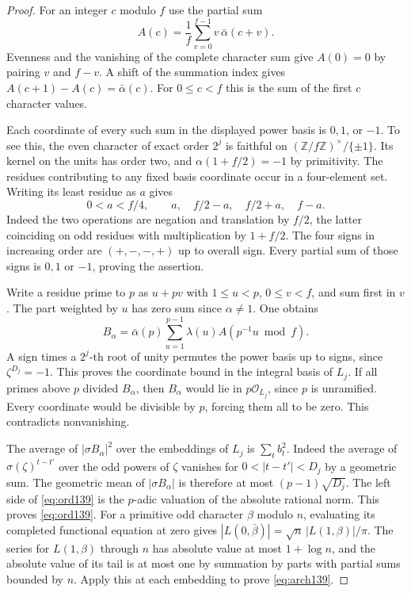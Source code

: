 \documentclass[a4paper,11pt]{article}
\theoremstyle{definition}
\theoremstyle{remark}
\newcommand{\ZZ}{\mathbb Z}\newcommand{\ord}{\operatorname{ord}}
\numberwithin{equation}{section}
\begin{document}
\begin{proof}
For an integer \(c\) modulo \(f\) use the partial sum
\[
 A(c)=\frac1f\sum_{v=0}^{f-1}v\,\bar\alpha(c+v).
\]
Evenness and the vanishing of the complete character sum give
\(A(0)=0\) by pairing \(v\) and \(f-v\). A shift of the summation
index gives \(A(c+1)-A(c)=\bar\alpha(c)\). For \(0\le c<f\)
this is the sum of the first \(c\) character values.

Each coordinate of every such sum in the displayed power basis
is \(0,1\), or \(-1\). To see this, the even character of exact
order \(2^j\) is faithful on
\((\ZZ/f\ZZ)^\times/\{\pm1\}\). Its kernel on the units has
order two, and \(\alpha(1+f/2)=-1\) by primitivity.
The residues contributing to any fixed basis coordinate occur
in a four-element set. Writing its least residue as \(a\) gives
\[
       0<a<f/4,\qquad a,\quad f/2-a,\quad f/2+a,\quad f-a .
\]
Indeed the two operations are negation and translation by
\(f/2\), the latter coinciding on odd residues with multiplication
by \(1+f/2\). The four signs in increasing order are
\((+,-,-,+)\) up to overall sign. Every partial sum of those
signs is \(0,1\) or \(-1\), proving the assertion.

Write a residue prime to \(p\) as \(u+pv\) with \(1\le u<p\),
\(0\le v<f\), and sum first in \(v\). The part weighted by
\(u\) has zero sum since \(\alpha\ne1\). One obtains
\[
      B_\alpha=\bar\alpha(p)\sum_{u=1}^{p-1}
                         \lambda(u)A(p^{-1}u\bmod f).
\]
A sign times a \(2^j\)-th root of unity permutes the power
basis up to signs, since \(\zeta^{D_j}=-1\). This proves the
coordinate bound in the integral basis of \(L_j\). If all
primes above \(p\) divided \(B_\alpha\), then \(B_\alpha\)
would lie in \(p\mathcal O_{L_j}\), since \(p\) is unramified.
Every coordinate would be divisible by \(p\), forcing them all
to be zero. This contradicts nonvanishing.

The average of \(|\sigma B_\alpha|^2\) over the embeddings of
\(L_j\) is \(\sum_t b_t^2\). Indeed the average of
\(\sigma(\zeta)^{t-t'}\) over the odd powers of \(\zeta\)
vanishes for \(0<|t-t'|<D_j\) by a geometric sum.
The geometric mean of \(|\sigma B_\alpha|\) is therefore
at most \((p-1)\sqrt{D_j}\). The left side of \eqref{eq:ord139}
is the \(p\)-adic valuation of the absolute rational norm.
This proves \eqref{eq:ord139}. For a primitive odd character
\(\beta\) modulo \(n\), evaluating its completed functional
equation at zero gives
\(|L(0,\bar\beta)|=\sqrt n\,|L(1,\beta)|/\pi\). The series
for \(L(1,\beta)\) through \(n\) has absolute value at most
\(1+\log n\), and the absolute value of its tail is at most
one by summation by parts with partial sums bounded by \(n\).
Apply this at each embedding to prove \eqref{eq:arch139}.
\end{proof}
\end{document}
